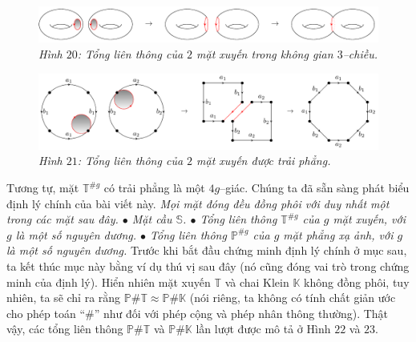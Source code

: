 \begin{multicols}{2}
	\begin{figure}[H]
		\vspace*{-5pt}
		\centering\captionsetup{labelformat=empty, justification=centering}
		\includegraphics[width=1\linewidth]{H20.pdf}
		\caption{\small\textit{\color{duongvaotoanhoc}Hình $20$: Tổng liên thông của $2$ mặt xuyến trong không gian $3$--chiều.}}
		\vspace*{-10pt}
	\end{figure}
	\begin{figure}[H]
		\vspace*{-5pt}
		\centering\captionsetup{labelformat=empty, justification=centering}
		\includegraphics[width=1\linewidth]{H21.pdf}
		\caption{\small\textit{\color{duongvaotoanhoc}Hình $21$: Tổng liên thông của $2$ mặt xuyến được trải phẳng.}}
		\vspace*{-10pt}
	\end{figure}
	Tương tự, mặt  $\mathbb{T}^{\# g}$ có trải phẳng là một $4g$--giác.
	\vskip 0.1cm
	Chúng ta đã sẵn sàng phát biểu định lý chính của bài viết này.
	\vskip 0.1cm
	{\it Mọi mặt đóng đều đồng phôi với duy nhất một trong các mặt sau đây.
	\vskip 0.1cm
	$\bullet$ Mặt cầu $\mathbb{S}$.
	\vskip 0.1cm
	$\bullet$ Tổng liên thông $\mathbb{T}^{\# g}$ của $g$ mặt xuyến, với $g$ là một số nguyên dương.
	\vskip 0.1cm
	$\bullet$ Tổng liên thông $\mathbb{P}^{\# g}$ của $g$ mặt phẳng xạ ảnh, với $g$ là một số nguyên dương.}
	\vskip 0.1cm
	Trước khi bắt đầu chứng minh định lý chính ở mục sau, ta kết thúc mục này bằng ví dụ thú vị sau đây (nó cũng đóng vai trò trong chứng minh của định lý). Hiển nhiên mặt xuyến $\mathbb{T}$ và chai Klein $\mathbb{K}$ không đồng phôi, tuy nhiên, ta sẽ chỉ ra rằng $\mathbb{P} \# \mathbb{T} \approx \mathbb{P} \# \mathbb{K}$ (nói riêng, ta không có tính chất giản ước cho phép toán ``$\#$'' như đối với phép cộng và phép nhân thông thường). Thật vậy, các tổng liên thông $\mathbb{P} \# \mathbb{T}$ và $\mathbb{P} \# \mathbb{K}$ lần lượt được mô tả ở Hình $22$ và $23$.
	\begin{figure}[H]

\end{figure}
\end{multicols}
